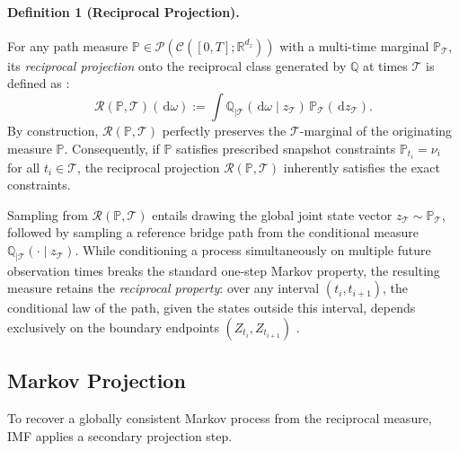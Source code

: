 \documentclass[review,onefignum,onetabnum]{siamart250211}
\newcommand{\R}{\mathbb{R}}
\newcommand{\dd}{\,\mathrm{d}}
\newcommand{\1}{\mathbf{1}}
\newcommand{\cP}{\mathcal{P}}
\begin{document}
\paragraph{Definition 1 (Reciprocal Projection).}
For any path measure $\mathbb{P} \in \cP(\mathcal{C}([0,T];\R^{d_z}))$ with a multi-time marginal $\mathbb{P}_{\mathcal{T}}$, its \emph{reciprocal projection} onto the reciprocal class generated by $\mathbb{Q}$ at times $\mathcal{T}$ is defined as \cite{leonard2013survey, park2025msbm}: 
\begin{equation}
\mathcal{R}(\mathbb{P}, \mathcal{T})(\dd \omega) := \int \mathbb{Q}_{\mid \mathcal{T}}(\dd \omega \mid z_{\mathcal{T}}) \, \mathbb{P}_{\mathcal{T}}(\dd z_{\mathcal{T}}).
\end{equation}
By construction, $\mathcal{R}(\mathbb{P}, \mathcal{T})$ perfectly preserves the $\mathcal{T}$-marginal of the originating measure $\mathbb{P}$. Consequently, if $\mathbb{P}$ satisfies prescribed snapshot constraints $\mathbb{P}_{t_i} = \nu_i$ for all $t_i \in \mathcal{T}$, the reciprocal projection $\mathcal{R}(\mathbb{P}, \mathcal{T})$ inherently satisfies the exact constraints.

Sampling from $\mathcal{R}(\mathbb{P}, \mathcal{T})$ entails drawing the global joint state vector $z_{\mathcal{T}} \sim \mathbb{P}_{\mathcal{T}}$, followed by sampling a reference bridge path from the conditional measure $\mathbb{Q}_{\mid\mathcal{T}}(\cdot\mid z_{\mathcal{T}})$. While conditioning a process simultaneously on multiple future observation times breaks the standard one-step Markov property, the resulting measure retains the \emph{reciprocal property}: over any interval $(t_i, t_{i+1})$, the conditional law of the path, given the states outside this interval, depends exclusively on the boundary endpoints $(Z_{t_i}, Z_{t_{i+1}})$ \cite{park2025msbm}. 

\subsection{Markov Projection}
To recover a globally consistent Markov process from the reciprocal measure, IMF applies a secondary projection step.
\end{document}
